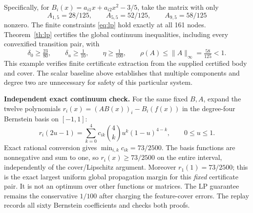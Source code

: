 \documentclass[10pt,letterpaper]{article}
\theoremstyle{remark}
\begin{document}
Specifically, for $B_i(x)=a_{i1}x+a_{i2}x^2-3/5$, take the matrix with only
\[
 A_{1,5}=28/125,\qquad A_{5,5}=52/125,\qquad A_{9,5}=58/125
\]
nonzero. The finite constraints \eqref{eq:lp} hold exactly at all 161 nodes. Theorem~\ref{th:lp} certifies the global continuum inequalities, including every convexified transition pair, with
\[
 \delta_0\geq\tfrac{23}{80},\qquad
 \delta_u\geq\tfrac1{10},\qquad
 \eta\geq\tfrac1{100},\qquad
 \rho(A)\leq\|A\|_\infty=\tfrac{58}{125}<1.
\]
This example verifies finite certificate extraction from the supplied certified body and cover. The scalar baseline above establishes that multiple components and degree two are unnecessary for safety of this particular system.

\textbf{Independent exact continuum check.}
For the same fixed $B,A$, expand the twelve polynomials
$r_i(x)=(AB(x))_i-B_i(f(x))$ in the degree-four Bernstein basis on $[-1,1]$:
\[
 r_i(2u-1)=\sum_{k=0}^4 c_{ik}\binom4k u^k(1-u)^{4-k},
 \qquad 0\leq u\leq1.
\]
Exact rational conversion gives $\min_{i,k}c_{ik}=73/2500$. The basis functions are nonnegative and sum to one, so $r_i(x)\geq73/2500$ on the entire interval, independently of the cover/Lipschitz argument. Moreover $r_1(1)=73/2500$; this is the exact largest uniform global propagation margin for this \emph{fixed} certificate pair. It is not an optimum over other functions or matrices. The LP guarantee remains the conservative $1/100$ after charging the feature-cover errors. The replay records all sixty Bernstein coefficients and checks both proofs.
\end{document}
